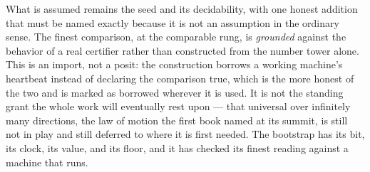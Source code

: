 What is assumed remains the seed and its decidability, with one honest addition that must be named exactly
because it is not an assumption in the ordinary sense. The finest comparison, at the comparable rung, is
\emph{grounded} against the behavior of a real certifier rather than constructed from the number tower
alone. This is an import, not a posit: the construction borrows a working machine's heartbeat instead of
declaring the comparison true, which is the more honest of the two and is marked as borrowed wherever it is
used. It is not the standing grant the whole work will eventually rest upon --- that universal over
infinitely many directions, the law of motion the first book named at its summit, is still not in play and
still deferred to where it is first needed. The bootstrap has its bit, its clock, its value, and its floor,
and it has checked its finest reading against a machine that runs.
